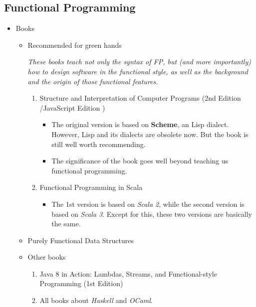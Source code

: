 \documentclass{article}
\begin{document}
\subsection{Functional Programming}
\begin{itemize}
    \item Books
    
    \begin{itemize}
        \item Recommended for green hands
        
        \emph{These books teach not only the syntax of FP, but (and more importantly) how to design software in the functional style, as well as the background and the origin of those functional features.}
        \begin{enumerate}
    \item Structure and Interpretation of Computer Programs (2nd Edition \cite{abelson1996structure}/JavaScript Edition \cite{abelson2022structure})
        \begin{itemize}
            \item The original version is based on \textbf{Scheme}, an Lisp dialect.
            However, Lisp and its dialects are obsolete now.
            But the book is still well worth recommending.
            \item The significance of the book goes well beyond teaching us functional programming.
        \end{itemize}
    \item Functional Programming in Scala
    \cite{chiusano2014functional}
            \begin{itemize}
                \item The 1st version is based on \emph{Scala 2}, while the second version is based on \emph{Scala 3}.
                Except for this, these two versions are basically the same.
            \end{itemize}
        \end{enumerate}
        \item Purely Functional Data Structures
        \cite{okasaki1999purely}
        \item Other books
            \begin{enumerate}
                \item Java 8 in Action: Lambdas, Streams, and Functional-style Programming (1st Edition) \cite{urma2014java}
                \item All books about \emph{Haskell} and \emph{OCaml}.
            \end{enumerate}
    \end{itemize}
\end{itemize}
\end{document}

